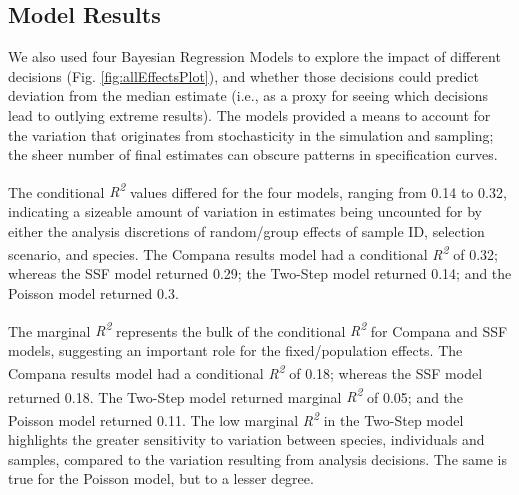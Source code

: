 \documentclass[10pt,a4paper]{article}
\begin{document}
\subsection{Model Results}\label{model-results}

We also used four Bayesian Regression Models to explore the impact of different decisions (Fig. \ref{fig:allEffectsPlot}), and whether those decisions could predict deviation from the median estimate (i.e., as a proxy for seeing which decisions lead to outlying extreme results).
The models provided a means to account for the variation that originates from stochasticity in the simulation and sampling; the sheer number of final estimates can obscure patterns in specification curves.

The conditional \emph{R\textsuperscript{2}} values differed for the four models, ranging from 0.14 to 0.32, indicating a sizeable amount of variation in estimates being uncounted for by either the analysis discretions of random/group effects of sample ID, selection scenario, and species.
The Compana results model had a conditional \emph{R\textsuperscript{2}} of 0.32; whereas the SSF model returned 0.29; the Two-Step model returned 0.14; and the Poisson model returned 0.3.

The marginal \emph{R\textsuperscript{2}} represents the bulk of the conditional \emph{R\textsuperscript{2}} for Compana and SSF models, suggesting an important role for the fixed/population effects.
The Compana results model had a conditional \emph{R\textsuperscript{2}} of 0.18; whereas the SSF model returned 0.18.
The Two-Step model returned marginal \emph{R\textsuperscript{2}} of 0.05; and the Poisson model returned 0.11.
The low marginal \emph{R\textsuperscript{2}} in the Two-Step model highlights the greater sensitivity to variation between species, individuals and samples, compared to the variation resulting from analysis decisions.
The same is true for the Poisson model, but to a lesser degree.
\end{document}
